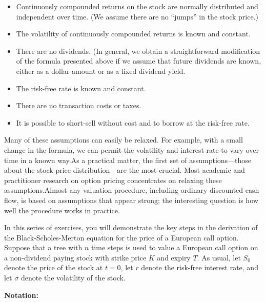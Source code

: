 \documentclass[letterpaper,10pt]{article}
\begin{document}
\begin{itemize}

\item Continuously compounded returns on the stock are normally distributed and independent over time. (We assume there are no ``jumps” in the stock price.)

\item The volatility of continuously compounded returns is known and constant.

\item There are no dividends.  (In general, we obtain a straightforward modification of the formula presented above if we assume that future dividends are known, either as a dollar amount or as a fixed dividend yield.


\item The risk-free rate is known and constant.

\item There are no transaction costs or taxes.


\item It is possible to short-sell without cost and to borrow at the risk-free rate.

\end{itemize}

\noindent Many of these assumptions can easily be relaxed. For example, with a small change in the formula, we can permit the volatility and interest rate to vary over time in a known way.As a practical matter, the first set of assumptions—those about the stock price distribution—are the most crucial. Most academic and practitioner research on option pricing concentrates on relaxing these assumptions.Almost any valuation procedure, including ordinary discounted cash flow, is based on assumptions that appear strong; the interesting question is how well the procedure works in practice.

\bigskip

\noindent In this series of exercises, you will demonstrate the key steps in the derivation of the Black-Scholes-Merton equation for the price of a European call option.  Suppose that a tree with $n$ time steps is used to value a European call option on a non-dividend paying stock with strike price $K$ and expiry $T$.  As usual, let $S_0$ denote the price of the stock at $t=0$, let $r$ denote the risk-free interest rate, and let $\sigma$ denote the volatility of the stock.

\bigskip

\noindent\textbf{Notation:}
\end{document}
